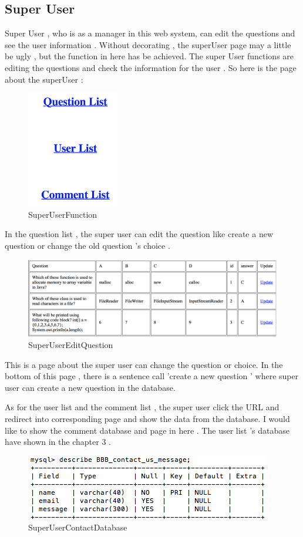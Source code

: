 \documentclass[12pt]{article}
\begin{document}
\subsection{Super User}
Super User , who is as a manager in this web system,  can edit the questions and see the user information .  Without decorating , the superUser page may a little be ugly , but the function in here has be achieved. The super User functions are editing the questions and check the information for the user . So here is the page about the superUser :
\begin{figure}[H]
\centering	
\includegraphics[height=2in]{images/SuperUserFunction.jpg}
\caption[SuperUserFunction]{SuperUserFunction}
\label{SuperUserFunction}
\end{figure}

In the question list , the super user can edit the question like create a new question or change the old question 's choice . 
\begin{figure}[H]
\centering	
\includegraphics[width=15cm]{images/SuperUserEditQuestion.jpg}
\caption[SuperUserEditQuestion]{SuperUserEditQuestion}
\label{SuperUserEditQuestion}
\end{figure}
This is a page about the super user can change the question or choice. In the bottom of this page , there is a sentence call 'create a new question ' where super user can create a new question in the database. 

	As for the user list and the comment list , the super user click the URL and redirect into corresponding page and show the data from the database. I would like to show the comment database and page in here . The user list 's database have shown in the chapter 3 . 
\begin{figure}[H]
\centering	
\includegraphics[]{images/SuperUserContactDatabase.jpg}

\caption[SuperUserContactDatabase]{SuperUserContactDatabase}
\label{SuperUserContactDatabase}
\end{figure}
\end{document}
